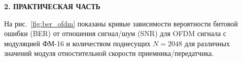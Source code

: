 \clearpage
\begin{center}
  \textbf{\large 2. ПРАКТИЧЕСКАЯ ЧАСТЬ}
\end{center}


На рис.~\ref{fig:ber_ofdm} показаны кривые зависимости вероятности битовой ошибки (BER)
от отношения сигнал/шум (SNR) для OFDM сигнала с модуляцией ФМ-16 и количеством поднесущих
$N = 2048$ для различных значений модуля отностительной скорости приемника/передатчика.





